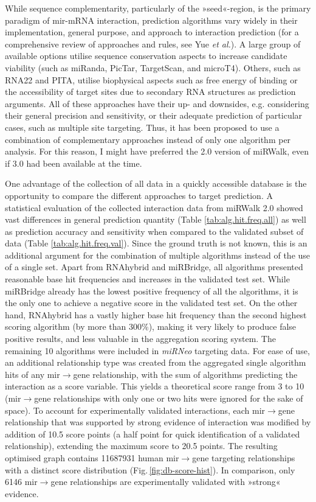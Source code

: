 While sequence complementarity, particularly of the »seed«-region, is the primary paradigm of \ac{mir}-mRNA interaction, prediction algorithms vary widely in their implementation, general purpose, and approach to interaction prediction (for a comprehensive review of approaches and rules, see Yue \emph{et al.}\cite{Yue2009}). A large group of available options utilise sequence conservation aspects to increase candidate viability (such as miRanda, PicTar, TargetScan, and microT4). Others, such as RNA22 and PITA, utilise biophysical aspects such as free energy of binding or the accessibility of target sites due to secondary RNA structures as prediction arguments. All of these approaches have their up- and downsides, e.g. considering their general precision and sensitivity, or their adequate prediction of particular cases, such as multiple site targeting. Thus, it has been proposed to use a combination of complementary approaches instead of only one algorithm per analysis.\cite{Witkos2011} For this reason, I might have preferred the 2.0 version of miRWalk, even if 3.0 had been available at the time.

One advantage of the collection of all data in a quickly accessible database is the opportunity to compare the different approaches to target prediction. A statistical evaluation of the collected interaction data from miRWalk 2.0 showed vast differences in general prediction quantity (Table \ref{tab:alg.hit.freq.all}) as well as prediction accuracy and sensitivity when compared to the validated subset of data (Table \ref{tab:alg.hit.freq.val}). Since the ground truth is not known, this is an additional argument for the combination of multiple algorithms instead of the use of a single set. Apart from RNAhybrid and miRBridge, all algorithms presented reasonable base hit frequencies and increases in the validated test set. While miRBridge already has the lowest positive frequency of all the algorithms, it is the only one to achieve a negative score in the validated test set. On the other hand, RNAhybrid has a vastly higher base hit frequency than the second highest scoring algorithm (by more than \num{300}\%), making it very likely to produce false positive results, and less valuable in the aggregation scoring system. The remaining 10 algorithms were included in \textit{miRNeo} targeting data. For ease of use, an additional relationship type was created from the aggregated single algorithm hits of any \ac{mir}$\to$gene relationship, with the sum of algorithms predicting the interaction as a score variable. This yields a theoretical score range from \num{3} to \num{10} (\ac{mir}$\to$gene relationships with only one or two hits were ignored for the sake of space). To account for experimentally validated interactions, each \ac{mir}$\to$gene relationship that was supported by strong evidence of interaction was modified by addition of \num{10.5} score points (a half point for quick identification of a validated relationship), extending the maximum score to \num{20.5} points. The resulting optimised graph contains \num{11687931} human \ac{mir}$\to$gene targeting relationships with a distinct score distribution (Fig.\,\ref{fig:db-score-hist}). In comparison, only 6146 \ac{mir}$\to$gene relationships are experimentally validated with »strong« evidence.

